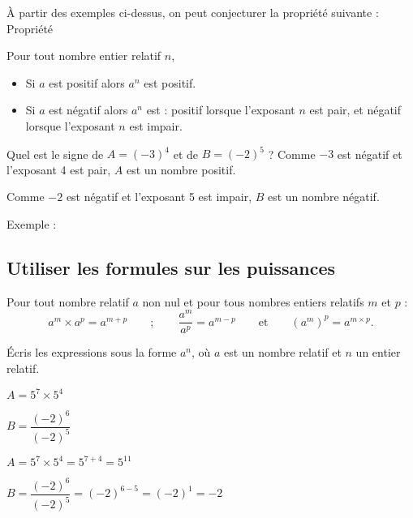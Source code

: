 À partir des exemples ci-dessus, on peut conjecturer la propriété suivante : 
 Propriété 

\begin{propriete}
Pour tout nombre entier relatif $n$,
\begin{itemize}
    \item Si $a$ est positif alors $a^n$ est positif.
    \item Si $a$ est négatif alors $a^n$ est : \subitem positif lorsque l'exposant $n$ est pair,
			       \subitem et négatif lorsque l'exposant $n$ est impair.
\end{itemize}
\end{propriete}

\begin{exemple*1}
Quel est le signe de $A = (-3)^4$ et de $B = (-2)^5$ ?
\correction
Comme $-3$ est négatif et l'exposant 4 est pair, $A$ est un nombre positif.

Comme $-2$ est négatif et l'exposant 5 est impair, $B$ est un nombre négatif.
\end{exemple*1}
Exemple : 



\subsection{Utiliser les formules sur les puissances}


\begin{aconnaitre}
Pour tout nombre relatif $a$ non nul et pour tous nombres entiers relatifs $m$ et $p$ :
\[ a^m \times a^p = a^{m+p} \qquad ; \qquad \dfrac{a^m}{a^p}=a^{m-p} \qquad \text{et} \qquad (a^m)^p = a^{m\times p} .\]
\end{aconnaitre}

\begin{exemple*1}
Écris les expressions sous la forme $a^n$, où $a$ est un nombre relatif et $n$ un entier relatif.

$A=5^7 \times 5^4$

$B=\dfrac{(-2)^6}{(-2)^5}$

\correction

$A = 5^7 \times 5^4 = 5^{7+4}=5^{11}$

$B=\dfrac{(-2)^6}{(-2)^5}=(-2)^{6-5}=(-2)^1=-2$
\end{exemple*1}


